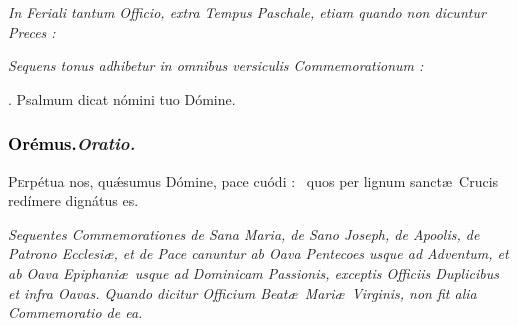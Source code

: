 \documentclass[12pt]{article} %
\def\noinitial{%
\gresetfirstlineaboveinitial{\textcolor{benred8}{\small \textsc{\textbf{}}}}{\textcolor{benred8}{\small \textsc{\textbf{}}}}
\setspaceafterinitial{0pt plus 0em minus 0em}%
\setspacebeforeinitial{0pt plus 0em minus 0em}%
\relax %
}
\newenvironment{rubric}{\vspace{2 mm}\color{benred8} \itshape \leftskip 0in \setlength{\parindent}{0.25in}}{\vspace{2 mm}}
\newenvironment{response}{\leftskip 0in \setlength{\parindent}{0in}}{\vspace{2 mm}}
\let\oldgresixstar\gresixstar
\renewcommand{\gresixstar}{\textcolor{benred8}{\oldgresixstar}}
\let\oldRbar\Rbar
\renewcommand{\Rbar}{\textcolor{benred8}{\oldRbar .}}
\def\capitulumSpace{\hspace{20 mm}}
\begin{document}
\begin{rubric}
In Feriali tantum Officio, extra Tempus Paschale, etiam quando non dicuntur Preces :

\end{rubric}


\gresetfirstlineaboveinitial{\small \textsc{ \textbf{\textcolor{benred8}{II}}}}{\small \textsc{ \textbf{\textcolor{benred8}{II}}}}

\begin{rubric}
Sequens tonus adhibetur in omnibus versiculis Commemorationum :

\end{rubric}

{\noinitial
{}

}

\begin{response}
\hspace{1.0 mm}\Rbar\hspace{0.3mm} Psalmum \hspace{3.4mm} dicat \hspace{3.4mm} n\'{o}mini \hspace{3.9mm} tuo \hspace{3.4mm} D\'{o}mine.

\end{response}

\subsubsection*{\textcolor{black}{Or\'{e}mus.}\capitulumSpace \emph{Oratio.}}

\begin{response}\lettrine[nindent=-1.5mm]{P}{e}rp\'{e}tua nos, qu\'{\ae}sumus D\'{o}mine, pace cu\'{o}di : \gresixstar\ quos per lignum sanct\ae\ Crucis red\'{i}mere dign\'{a}tus es.

\end{response}

\begin{rubric}
Sequentes Commemorationes de Sana Maria, de Sano Joseph, de Apoolis, de Patrono Ecclesi\ae , et de Pace canuntur ab Oava Pentecoes usque ad Adventum, et ab Oava Epiphani\ae\ usque ad Dominicam Passionis, exceptis Officiis Duplicibus et infra Oavas. Quando dicitur Officium Beat\ae\ Mari\ae\ Virginis, non fit alia Commemoratio de ea.

\end{rubric}
\end{document}
